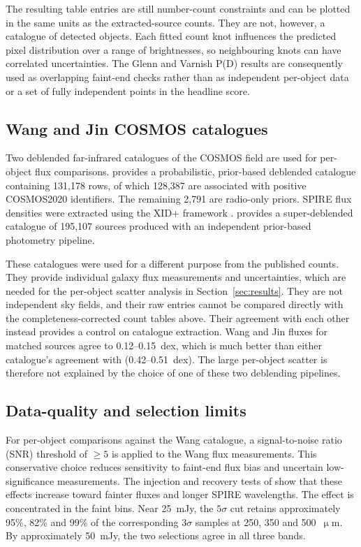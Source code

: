 \documentclass[12pt,a4paper]{article}
\begin{document}
The resulting table entries are still number-count constraints and can be plotted in
the same units as the extracted-source counts. They are not, however, a catalogue of
detected objects. Each fitted count knot influences the predicted pixel distribution
over a range of brightnesses, so neighbouring knots can have correlated uncertainties.
The Glenn and Varnish P(D) results are consequently used as overlapping faint-end
checks rather than as independent per-object data or a set of fully independent points
in the headline score.

\subsection{Wang and Jin COSMOS catalogues}
\label{sec:data:catalogues}

Two deblended far-infrared catalogues of the COSMOS field are used for per-object flux
comparisons. \citet{Wang_2024} provides a probabilistic, prior-based deblended catalogue
containing 131,178 rows, of which 128,387 are associated with positive COSMOS2020
identifiers. The remaining 2,791 are radio-only priors. SPIRE flux densities were
extracted using the XID+ framework \citep{Hurley_2017}. \citet{Jin_2018} provides a
super-deblended catalogue of 195,107 sources produced with an independent prior-based
photometry pipeline.

These catalogues were used for a different purpose from the published counts. They provide
individual galaxy flux measurements and uncertainties, which are needed for the
per-object scatter analysis in Section~\ref{sec:results}. They are not
independent sky fields, and their raw entries cannot be compared directly with the
completeness-corrected count tables above. Their agreement with each other instead
provides a control on catalogue extraction. Wang and Jin fluxes for matched sources agree to
0.12--\SI{0.15}{dex}, which is much better than either catalogue's agreement with
\popcosmos{} (0.42--\SI{0.51}{dex}). The large per-object scatter is therefore not
explained by the choice of one of these two deblending pipelines.

\subsection{Data-quality and selection limits}
\label{sec:data:quality}

For per-object comparisons against the Wang catalogue, a signal-to-noise ratio (SNR)
threshold of $\geq 5$ is applied to the Wang flux measurements. This conservative choice
reduces sensitivity to faint-end flux bias and uncertain low-significance measurements.
The injection and recovery tests of \citet{Wang_2024} show that these effects increase
toward fainter fluxes and longer SPIRE wavelengths.
The effect is concentrated in the faint bins. Near \SI{25}{mJy}, the $5\sigma$ cut
retains approximately 95\%, 82\% and 99\% of the corresponding $3\sigma$ samples at
250, 350 and 500~$\upmu$m. By approximately \SI{50}{mJy}, the two selections agree in
all three bands.
\end{document}
